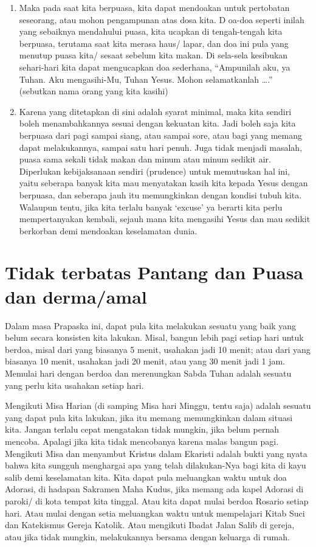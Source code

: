 \begin{enumerate}
\item Maka pada saat kita berpuasa, kita dapat mendoakan untuk pertobatan seseorang, atau mohon pengampunan atas dosa kita. D oa-doa seperti inilah yang sebaiknya mendahului puasa, kita ucapkan di tengah-tengah kita berpuasa, terutama saat kita merasa haus/ lapar, dan doa ini pula yang menutup puasa kita/ sesaat sebelum kita makan. Di sela-sela kesibukan sehari-hari kita dapat mengucapkan doa sederhana, ``Ampunilah aku, ya Tuhan. Aku mengasihi-Mu, Tuhan Yesus. Mohon selamatkanlah \ldots.'' (sebutkan nama orang yang kita kasihi)

\item Karena yang ditetapkan di sini adalah syarat minimal, maka kita sendiri boleh menambahkannya sesuai dengan kekuatan kita. Jadi boleh saja kita berpuasa dari pagi sampai siang, atau sampai sore, atau bagi yang memang dapat melakukannya, sampai satu hari penuh. Juga tidak menjadi masalah, puasa sama sekali tidak makan dan minum atau minum sedikit air. Diperlukan kebijaksanaan sendiri (prudence) untuk memutuskan hal ini, yaitu seberapa banyak kita mau menyatakan kasih kita kepada Yesus dengan berpuasa, dan seberapa jauh itu memungkinkan dengan kondisi tubuh kita. Walaupun tentu, jika kita terlalu banyak `excuse' ya berarti kita perlu mempertanyakan kembali, sejauh mana kita mengasihi Yesus dan mau sedikit berkorban demi mendoakan keselamatan dunia.
\end{enumerate}
\normalsize
\section*{Tidak terbatas Pantang dan Puasa dan derma/amal}

Dalam masa Prapaska ini, dapat pula kita melakukan sesuatu yang baik yang belum secara konsisten kita lakukan. Misal, bangun lebih pagi setiap hari untuk berdoa, misal dari yang biasanya 5 menit, usahakan jadi 10 menit; atau dari yang biasanya 10 menit, usahakan jadi 20 menit, atau yang 30 menit jadi 1 jam. Memulai hari dengan berdoa dan merenungkan Sabda Tuhan adalah sesuatu yang perlu kita usahakan setiap hari.

Mengikuti Misa Harian (di samping Misa hari Minggu, tentu saja) adalah sesuatu yang dapat pula kita lakukan, jika itu memang memungkinkan dalam situasi kita. Jangan terlalu cepat mengatakan tidak mungkin, jika belum pernah mencoba. Apalagi jika kita tidak mencobanya karena malas bangun pagi. Mengikuti Misa dan menyambut Kristus dalam Ekaristi adalah bukti yang nyata bahwa kita sungguh menghargai apa yang telah dilakukan-Nya bagi kita di kayu salib demi keselamatan kita. Kita dapat pula meluangkan waktu untuk doa Adorasi, di hadapan Sakramen Maha Kudus, jika memang ada kapel Adorasi di paroki/ di kota tempat kita tinggal. Atau kita dapat mulai berdoa Rosario setiap hari. Atau mulai dengan setia meluangkan waktu untuk mempelajari Kitab Suci dan Katekismus Gereja Katolik. Atau mengikuti Ibadat Jalan Salib di gereja, atau jika tidak mungkin, melakukannya bersama dengan keluarga di rumah.

